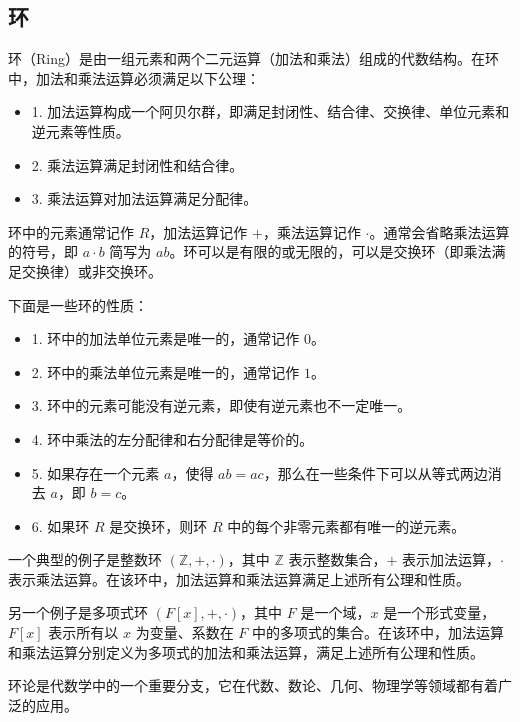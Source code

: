 \documentclass[UTF8,a4paper,11pt]{article}
\begin{document}
\subsection{环}
环（Ring）是由一组元素和两个二元运算（加法和乘法）组成的代数结构。在环中，加法和乘法运算必须满足以下公理：
\begin{itemize}
\item 1. 加法运算构成一个阿贝尔群，即满足封闭性、结合律、交换律、单位元素和逆元素等性质。
\item 2. 乘法运算满足封闭性和结合律。
\item 3. 乘法运算对加法运算满足分配律。
\end{itemize}
环中的元素通常记作 $R$，加法运算记作 $+$，乘法运算记作 $\cdot$。通常会省略乘法运算的符号，即 $a \cdot b$ 简写为 $ab$。环可以是有限的或无限的，可以是交换环（即乘法满足交换律）或非交换环。

下面是一些环的性质：
\begin{itemize}
\item 1. 环中的加法单位元素是唯一的，通常记作 $0$。
\item 2. 环中的乘法单位元素是唯一的，通常记作 $1$。
\item 3. 环中的元素可能没有逆元素，即使有逆元素也不一定唯一。
\item 4. 环中乘法的左分配律和右分配律是等价的。
\item 5. 如果存在一个元素 $a$，使得 $ab = ac$，那么在一些条件下可以从等式两边消去 $a$，即 $b = c$。
\item 6. 如果环 $R$ 是交换环，则环 $R$ 中的每个非零元素都有唯一的逆元素。
\end{itemize}
一个典型的例子是整数环 $(\mathbb{Z}, +, \cdot)$，其中 $\mathbb{Z}$ 表示整数集合，$+$ 表示加法运算，$\cdot$ 表示乘法运算。在该环中，加法运算和乘法运算满足上述所有公理和性质。

另一个例子是多项式环 $(F[x], +, \cdot)$，其中 $F$ 是一个域，$x$ 是一个形式变量，$F[x]$ 表示所有以 $x$ 为变量、系数在 $F$ 中的多项式的集合。在该环中，加法运算和乘法运算分别定义为多项式的加法和乘法运算，满足上述所有公理和性质。

环论是代数学中的一个重要分支，它在代数、数论、几何、物理学等领域都有着广泛的应用。
\end{document}
